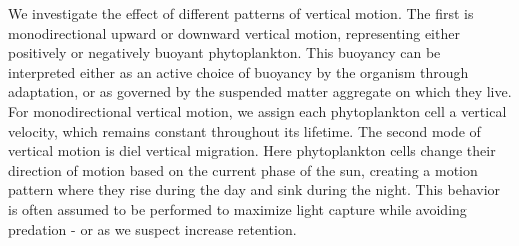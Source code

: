 \documentclass[npg, manuscript]{copernicus}
\begin{document}
\medskip

We investigate the effect of different patterns of vertical motion.
The first is monodirectional upward or downward vertical motion, representing either positively or negatively buoyant phytoplankton.
This buoyancy can be interpreted either as an active choice of buoyancy by the organism through adaptation, or as governed by the suspended matter aggregate on which they live.
For monodirectional vertical motion, we assign each phytoplankton cell a vertical velocity, which remains constant throughout its lifetime.
The second mode of vertical motion is diel vertical migration.
Here phytoplankton cells change their direction of motion based on the current phase of the sun, creating a motion pattern where they rise during the day and sink during the night.
This behavior is often assumed to be performed to maximize light capture while avoiding predation - or as we suspect increase retention. 
\end{document}
